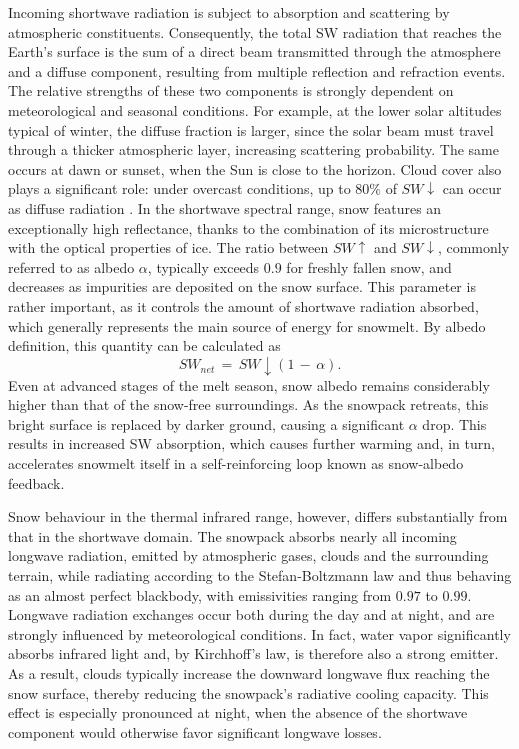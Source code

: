 Incoming shortwave radiation is subject to absorption and scattering by atmospheric constituents. Consequently, the total SW radiation that reaches 
the Earth's surface is the sum of a direct beam transmitted through the atmosphere and a diffuse component, resulting from multiple reflection and 
refraction events. The relative strengths of these two components is strongly dependent on meteorological and seasonal conditions. For example, at 
the lower solar altitudes typical of winter, the diffuse fraction is larger, since the solar beam must travel through a thicker atmospheric layer, 
increasing scattering probability. The same occurs at dawn or sunset, when the Sun is close to the horizon. Cloud cover also plays a significant 
role: under overcast conditions, up to $80 \%$ of $SW\downarrow$ can occur as diffuse radiation \parencite{snow_hydrology}. In the shortwave spectral 
range, snow features an exceptionally high reflectance, thanks to the combination of its microstructure with the optical properties of ice. The ratio 
between $SW\uparrow$ and $SW\downarrow$, commonly referred to as albedo $\alpha$, typically exceeds $0.9$ for freshly fallen snow, and decreases as 
impurities are deposited on the snow surface. This parameter is rather important, as it controls the amount of shortwave radiation absorbed, which 
generally represents the main source of energy for snowmelt. By albedo definition, this quantity can be calculated as
\begin{equation}
    SW_{net}\,=\,SW\downarrow \left(1\,-\,\alpha\right).
    \label{eq:SW_albedo}
\end{equation}
Even at advanced stages of the melt season, snow albedo remains considerably higher than that of the snow-free surroundings. As the snowpack 
retreats, this bright surface is replaced by darker ground, causing a significant $\alpha$ drop. This results in increased SW absorption, which 
causes further warming and, in turn, accelerates snowmelt itself in a self-reinforcing loop known as snow-albedo feedback.

Snow behaviour in the thermal infrared range, however, differs substantially from that in the shortwave domain. The snowpack absorbs nearly all incoming longwave 
radiation, emitted by atmospheric gases, clouds and the surrounding terrain, while radiating according to the Stefan-Boltzmann law and thus behaving as 
an almost perfect blackbody, with emissivities ranging from $0.97$ to $0.99$. Longwave radiation exchanges occur both during the day and at 
night, and are strongly influenced by meteorological conditions. In fact, water vapor significantly absorbs infrared light and, by  
Kirchhoff's law, is therefore also a strong emitter. As a result, clouds typically increase the downward longwave flux reaching the snow surface, thereby 
reducing the snowpack's radiative cooling capacity. This effect is especially pronounced at night, when the absence of the shortwave component would 
otherwise favor significant longwave losses.

